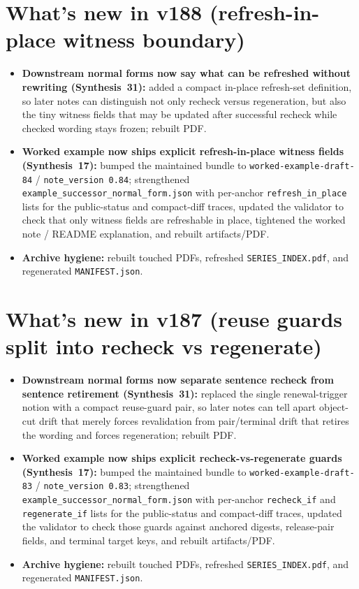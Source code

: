 \documentclass[11pt]{article}
\begin{document}
\section{What's new in v188 (refresh-in-place witness boundary)}
\begin{itemize}[leftmargin=*]
\item \textbf{Downstream normal forms now say what can be refreshed without rewriting (Synthesis~31):} added a compact in-place refresh-set definition, so later notes can distinguish not only recheck versus regeneration, but also the tiny witness fields that may be updated after successful recheck while checked wording stays frozen; rebuilt PDF.
\item \textbf{Worked example now ships explicit refresh-in-place witness fields (Synthesis~17):} bumped the maintained bundle to \texttt{worked-example-draft-84} / \texttt{note\_version 0.84}; strengthened \texttt{example\_successor\_normal\_form.json} with per-anchor \texttt{refresh\_in\_place} lists for the public-status and compact-diff traces, updated the validator to check that only witness fields are refreshable in place, tightened the worked note / README explanation, and rebuilt artifacts/PDF.
\item \textbf{Archive hygiene:} rebuilt touched PDFs, refreshed \texttt{SERIES\_INDEX.pdf}, and regenerated \texttt{MANIFEST.json}.
\end{itemize}


\section{What's new in v187 (reuse guards split into recheck vs regenerate)}
\begin{itemize}[leftmargin=*]
\item \textbf{Downstream normal forms now separate sentence recheck from sentence retirement (Synthesis~31):} replaced the single renewal-trigger notion with a compact reuse-guard pair, so later notes can tell apart object-cut drift that merely forces revalidation from pair/terminal drift that retires the wording and forces regeneration; rebuilt PDF.
\item \textbf{Worked example now ships explicit recheck-vs-regenerate guards (Synthesis~17):} bumped the maintained bundle to \texttt{worked-example-draft-83} / \texttt{note\_version 0.83}; strengthened \texttt{example\_successor\_normal\_form.json} with per-anchor \texttt{recheck\_if} and \texttt{regenerate\_if} lists for the public-status and compact-diff traces, updated the validator to check those guards against anchored digests, release-pair fields, and terminal target keys, and rebuilt artifacts/PDF.
\item \textbf{Archive hygiene:} rebuilt touched PDFs, refreshed \texttt{SERIES\_INDEX.pdf}, and regenerated \texttt{MANIFEST.json}.
\end{itemize}
\end{document}
